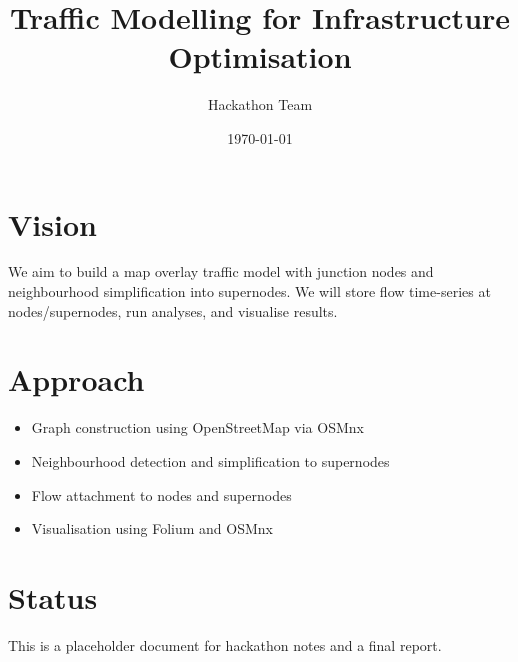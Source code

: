 \documentclass{article}
\title{Traffic Modelling for Infrastructure Optimisation}
\author{Hackathon Team}
\date{\today}
\begin{document}
\maketitle

\section{Vision}
We aim to build a map overlay traffic model with junction nodes and neighbourhood simplification into supernodes. We will store flow time-series at nodes/supernodes, run analyses, and visualise results.

\section{Approach}
\begin{itemize}
  \item Graph construction using OpenStreetMap via OSMnx
  \item Neighbourhood detection and simplification to supernodes
  \item Flow attachment to nodes and supernodes
  \item Visualisation using Folium and OSMnx
\end{itemize}

\section{Status}
This is a placeholder document for hackathon notes and a final report.
\end{document}
